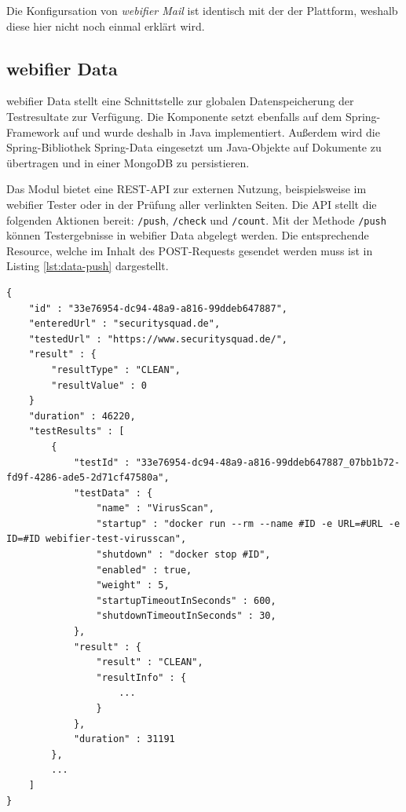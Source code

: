 Die Konfigursation von \textit{webifier Mail} ist identisch mit der der Plattform, weshalb diese hier nicht noch einmal erklärt wird.

\subsection{webifier Data}
\label{sec:umsetzung-data}

webifier Data stellt eine Schnittstelle zur globalen Datenspeicherung der Testresultate zur Verfügung. Die Komponente setzt ebenfalls auf dem Spring-Framework auf und wurde deshalb in Java implementiert. Außerdem wird die Spring-Bibliothek Spring-Data eingesetzt um Java-Objekte auf Dokumente zu übertragen und in einer MongoDB zu persistieren.

Das Modul bietet eine \ac{REST}-\ac{API} zur externen Nutzung, beispielsweise im webifier Tester oder in der Prüfung aller verlinkten Seiten. Die API stellt die folgenden Aktionen bereit: \lstinline[style=eclipse]{/push}, \lstinline[style=eclipse]{/check} und \lstinline[style=eclipse]{/count}. Mit der Methode \lstinline[style=eclipse]{/push} können Testergebnisse in webifier Data abgelegt werden. Die entsprechende Resource, welche im Inhalt des POST-Requests gesendet werden muss ist in Listing \ref{lst:data-push} dargestellt.

\begin{scriptsize}
\begin{lstlisting}
{
    "id" : "33e76954-dc94-48a9-a816-99ddeb647887",
    "enteredUrl" : "securitysquad.de",
    "testedUrl" : "https://www.securitysquad.de/",
    "result" : {
        "resultType" : "CLEAN",
        "resultValue" : 0
    }
    "duration" : 46220,
    "testResults" : [
        {
            "testId" : "33e76954-dc94-48a9-a816-99ddeb647887_07bb1b72-fd9f-4286-ade5-2d71cf47580a",
            "testData" : {
                "name" : "VirusScan",
                "startup" : "docker run --rm --name #ID -e URL=#URL -e ID=#ID webifier-test-virusscan",
                "shutdown" : "docker stop #ID",
                "enabled" : true,
                "weight" : 5,
                "startupTimeoutInSeconds" : 600,
                "shutdownTimeoutInSeconds" : 30,
            },
            "result" : {
                "result" : "CLEAN",
                "resultInfo" : {
                    ...
                }
            },
            "duration" : 31191
        },
        ...
    ]
}
\end{lstlisting}
\end{scriptsize}

